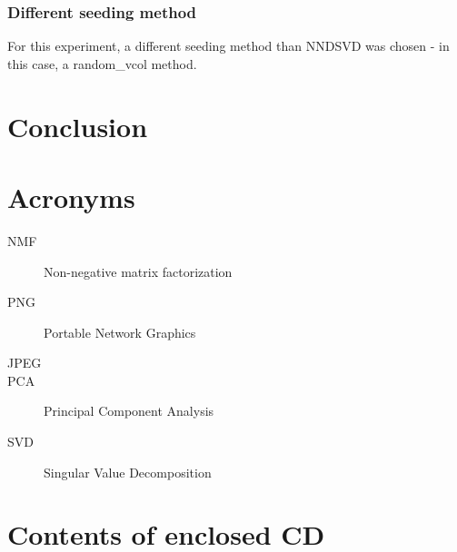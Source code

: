 \documentclass[thesis=M,english]{FITthesis}[2012/10/20]
\begin{document}
\subsection{Different seeding method}
For this experiment, a different seeding method than NNDSVD was chosen - in this case, a
random\_vcol method.

\chapter{Conclusion}





\appendix

\chapter{Acronyms}
\begin{description}
  \item[NMF] Non-negative matrix factorization
  \item[PNG] Portable Network Graphics
  \item[JPEG]
  \item[PCA] Principal Component Analysis
  \item[SVD] Singular Value Decomposition
\end{description}


\chapter{Contents of enclosed CD}


\begin{figure}
\end{figure}
\end{document}
